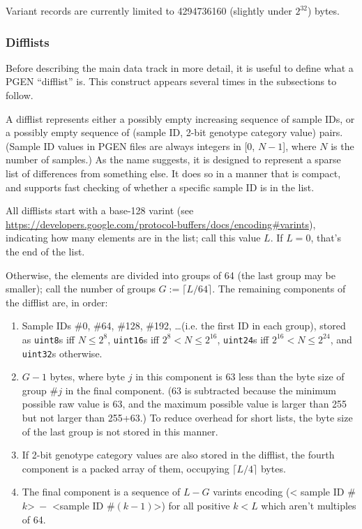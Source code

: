 \documentclass[8pt]{article}
\begin{document}
Variant records are currently limited to 4294736160 (slightly under $2^{32}$)
bytes.

\subsubsection{Difflists}

Before describing the main data track in more detail, it is useful to define
what a PGEN ``difflist'' is.  This construct appears several times in the
subsections to follow.

A difflist represents either a possibly empty increasing sequence of sample
IDs, or a possibly empty sequence of (sample ID, 2-bit genotype category value)
pairs.  (Sample ID values in PGEN files are always integers in [0, $N-1$],
where $N$ is the number of samples.)  As the name suggests, it is designed to
represent a sparse list of differences from something else.  It does so in a
manner that is compact, and supports fast checking of whether a specific sample
ID is in the list.

All difflists start with a base-128 varint (see
\url{https://developers.google.com/protocol-buffers/docs/encoding#varints}),
indicating how many elements are in the list; call this value $L$.  If $L=0$,
that's the end of the list.

Otherwise, the elements are divided into groups of 64 (the last group may be
smaller); call the number of groups $G:=\lceil L/64\rceil $.  The remaining
components of the difflist are, in order:

\begin{enumerate}
\item Sample IDs \#0, \#64, \#128, \#192, \ldots (i.e. the first ID in each
  group), stored as \texttt{uint8}s iff $N\leq 2^8$, \texttt{uint16}s iff
  $2^8<N\leq 2^{16}$, \texttt{uint24}s iff $2^{16}<N\leq 2^{24}$, and
  \texttt{uint32}s otherwise.
\item $G-1$ bytes, where byte $j$ in this component is 63 less than the byte
  size of group \#$j$ in the final component.  (63 is subtracted because the
  minimum possible raw value is 63, and the maximum possible value is larger
  than 255 but not larger than 255+63.)  To reduce overhead for short lists,
  the byte size of the last group is not stored in this manner.
\item If 2-bit genotype category values are also stored in the difflist, the
  fourth component is a packed array of them, occupying $\lceil L/4\rceil $
  bytes.
\item The final component is a sequence of $L-G$ varints encoding (\textless
  sample ID \#$k$\textgreater $\>-$ \textless sample ID \#$(k-1)$\textgreater)
  for all positive $k<L$ which aren't multiples of 64.
\end{enumerate}
\end{document}

